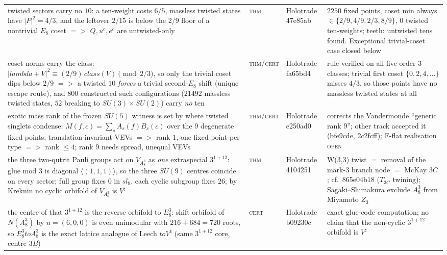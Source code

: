 \documentclass[12pt,a4paper]{article}
\def\mathbb#1{#1}%
\def\mathrm#1{#1}%
\def\mathfrak#1{#1}%
\def\texttt#1{#1}%
\def\lambda{lambda}%
\def\cdot{ }%
\def\to{ to }%
\def\Rightarrow{ => }%
\theoremstyle{definition}
\newcommand{\ZZ}{\mathbb{Z}}
\begin{document}
\begin{center}
\begin{tabular}{@{}p{}llp{}@{}}
twisted sectors carry no $10$: a ten-weight costs $6/5$, massless twisted states have $|P|^2=4/3$, and the leftover $2/15$ is below the $2/9$ floor of a nontrivial $E_8$ coset $\Rightarrow$ $Q,u^c,e^c$ are untwisted-only & \textsc{thm} & Holotrade \texttt{47e85ab} & $2250$ fixed points, coset min always $\in\{2/9,4/9,2/3,8/9\}$, $0$ twisted ten-weights; teeth: untwisted tens found. Exceptional trivial-coset case closed below \\
coset norms carry the class: $|\lambda+V|^2\equiv(2/9)\,\mathrm{class}(V)\pmod{2/3}$, so only the trivial coset dips below $2/9$ $\Rightarrow$ a twisted $10$ \emph{forces} a trivial second-$E_8$ shift (unique escape route), and $800$ constructed such configurations ($21492$ massless twisted states, $52$ breaking to $SU(3){\times}SU(2)$) carry \emph{no} ten & \textsc{thm}/\textsc{cert} & Holotrade \texttt{fa65bd4} & rule verified on all five order-$3$ classes; trivial first coset $\{0,2,4,\dots\}$ misses $4/3$, so those points have no massless twisted states at all \\
exotic mass rank of the frozen $SU(5)$ witness is set by where twisted singlets condense: $M(f,c)=\sum_s A_s(f)B_s(c)$ over the $9$ degenerate fixed points; translation-invariant VEVs $\Rightarrow$ rank $1$, one fixed point per type $\Rightarrow$ rank $\le 4$; rank $9$ needs spread, unequal VEVs & \textsc{thm}/\textsc{cert} & Holotrade \texttt{e250ad0} & corrects the Vandermonde ``generic rank 9''; other track accepted it (\texttt{bfe9cde}, \texttt{2c2fcff}); F-flat realisation \textsc{open} \\
the three two-qutrit Pauli groups act on $V_{A_8^3}$ as \emph{one} extraspecial $3^{1+12}$: glue mod $3$ is diagonal $\langle(1,1,1)\rangle$, so the three $SU(9)$ centres coincide on every sector; full group fixes $0$ in $\mathfrak{sl}_9$, each cyclic subgroup fixes $26$; by Kreknin no cyclic orbifold of $V_{A_8^3}$ is $V^\natural$ & \textsc{thm} & Holotrade \texttt{4104251} & W(3,3) twist $=$ removal of the mark-$3$ branch node $=$ McKay $3C$; cf.\ \texttt{865e04b18} ($T_{3C}$ twining); Sagaki--Shimakura exclude $A_8^3$ from Miyamoto $\ZZ_3$ \\
the centre of that $3^{1+12}$ is the reverse orbifold to $E_8^3$: shift orbifold of $N(A_8^3)$ by $u=(6,0,0)$ is even unimodular with $216+6\cdot 84=720$ roots, so $E_8^3\to A_8^3$ is the exact lattice analogue of Leech $\to V^\natural$ (same $3^{1+12}$ core, centre $3B$) & \textsc{cert} & Holotrade \texttt{b09230c} & exact glue-code computation; no claim that the non-cyclic $3^{1+12}$ orbifold is $V^\natural$ \\

\end{tabular}
\end{center}
\end{document}
